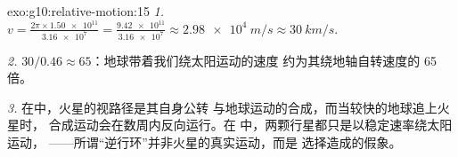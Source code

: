 \begin{solution}{exo:g10:relative-motion:15}
\emph{1.} $v = \frac{2\pi \times \num{1.50e11}}{\num{3.16e7}}
= \frac{\num{9.42e11}}{\num{3.16e7}} \approx \qty{2.98e4}{m/s}
\approx \qty{30}{km/s}$.

\emph{2.} $30 / 0.46 \approx 65$：地球带着我们绕太阳运动的速度
约为其绕地轴自转速度的 65 倍。

\emph{3.} 在中，火星的视路径是其自身公转
与地球运动的合成，而当较快的地球追上火星时，
合成运动会在数周内反向运行。在
中，两颗行星都只是以稳定速率绕太阳运动，
——所谓“逆行环”并非火星的真实运动，而是
选择造成的假象。
\end{solution}

